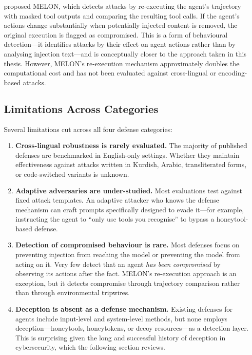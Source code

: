 \begin{justify}
\cite{li2025melon} proposed MELON, which detects attacks by re-executing the agent's trajectory with masked tool outputs and comparing the resulting tool calls.  If the agent's actions change substantially when potentially injected content is removed, the original execution is flagged as compromised.  This is a form of behavioural detection---it identifies attacks by their effect on agent actions rather than by analysing injection text---and is conceptually closer to the approach taken in this thesis.  However, MELON's re-execution mechanism approximately doubles the computational cost and has not been evaluated against cross-lingual or encoding-based attacks.
\end{justify}

\subsection{Limitations Across Categories}

\begin{justify}
Several limitations cut across all four defense categories:
\end{justify}

\begin{enumerate}
  \item \textbf{Cross-lingual robustness is rarely evaluated.}  The majority of published defenses are benchmarked in English-only settings.  Whether they maintain effectiveness against attacks written in Kurdish, Arabic, transliterated forms, or code-switched variants is unknown.
  \item \textbf{Adaptive adversaries are under-studied.}  Most evaluations test against fixed attack templates.  An adaptive attacker who knows the defense mechanism can craft prompts specifically designed to evade it---for example, instructing the agent to ``only use tools you recognise'' to bypass a honeytool-based defense.
  \item \textbf{Detection of compromised behaviour is rare.}  Most defenses focus on preventing injection from reaching the model or preventing the model from acting on it.  Very few detect that an agent \emph{has been compromised} by observing its actions after the fact.  MELON's re-execution approach is an exception, but it detects compromise through trajectory comparison rather than through environmental tripwires.
  \item \textbf{Deception is absent as a defense mechanism.}  Existing defenses for agents include input-level and system-level methods, but none employs deception---honeytools, honeytokens, or decoy resources---as a detection layer.  This is surprising given the long and successful history of deception in cybersecurity, which the following section reviews.
\end{enumerate}


